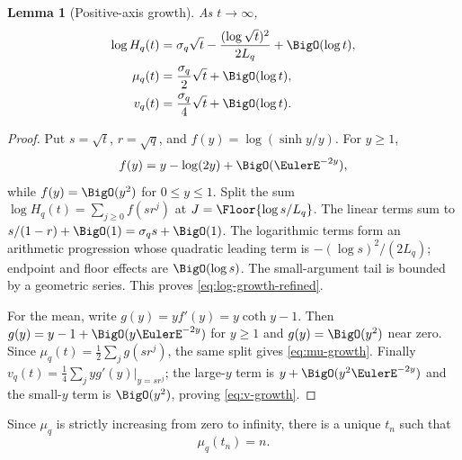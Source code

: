 \documentclass[11pt]{article}
\numberwithin{equation}{section}
\newtheorem{lemma}[theorem]{Lemma}
\theoremstyle{definition}
\theoremstyle{remark}
\begin{document}
\begin{lemma}[Positive-axis growth]\label{lem:positive-growth}
As $t\to\infty$,
\begin{align}
 \log H_q(t)&=\sigma_q\sqrt t-\frac{(\log\sqrt t)^2}{2L_q}+\BigO(\log t),\label{eq:log-growth-refined}\\
 \mu_q(t)&=\frac{\sigma_q}{2}\sqrt t+\BigO(\log t),\label{eq:mu-growth}\\
 v_q(t)&=\frac{\sigma_q}{4}\sqrt t+\BigO(\log t).
 \label{eq:v-growth}
\end{align}
\end{lemma}
\begin{proof}
Put $s=\sqrt t$, $r=\sqrt q$, and
$f(y)=\log(\sinh y/y)$.  For $y\ge1$,
\[
 f(y)=y-\log(2y)+\BigO(\EulerE^{-2y}),
\]
while $f(y)=\BigO(y^2)$ for $0\le y\le1$.  Split the sum
$\log H_q(t)=\sum_{j\ge0}f(sr^j)$ at
$J=\Floor{\log s/L_q}$.  The linear terms sum to
$s/(1-r)+\BigO(1)=\sigma_qs+\BigO(1)$.  The logarithmic terms form an arithmetic progression whose quadratic leading term is
$-(\log s)^2/(2L_q)$; endpoint and floor effects are $\BigO(\log s)$.  The small-argument tail is bounded by a geometric series.  This proves \eqref{eq:log-growth-refined}.

For the mean, write $g(y)=yf'(y)=y\coth y-1$.  Then
$g(y)=y-1+\BigO(y\EulerE^{-2y})$ for $y\ge1$ and $g(y)=\BigO(y^2)$ near zero.  Since
$\mu_q(t)=\frac12\sum_jg(sr^j)$, the same split gives \eqref{eq:mu-growth}.  Finally
$v_q(t)=\frac14\sum_j y g'(y)|_{y=sr^j}$; the large-$y$ term is $y+\BigO(y^2\EulerE^{-2y})$ and the small-$y$ term is $\BigO(y^2)$, proving \eqref{eq:v-growth}.
\end{proof}

Since $\mu_q$ is strictly increasing from zero to infinity, there is a unique $t_n$ such that
\begin{equation}\label{eq:saddle}
 \mu_q(t_n)=n.
\end{equation}
\end{document}
